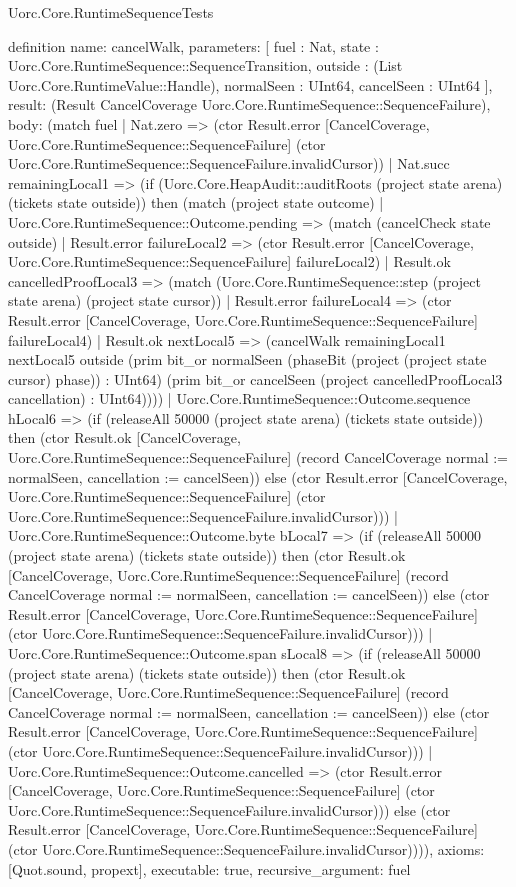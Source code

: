 \begin{lexlean}{Uorc.Core.RuntimeSequenceTests}
\begin{semanticmodule}
definition{
  name: cancelWalk,
  parameters: [
    fuel : Nat,
    state : Uorc.Core.RuntimeSequence::SequenceTransition,
    outside : (List Uorc.Core.RuntimeValue::Handle),
    normalSeen : UInt64,
    cancelSeen : UInt64
  ],
  result: (Result CancelCoverage Uorc.Core.RuntimeSequence::SequenceFailure),
  body: (match fuel
    | Nat.zero => (ctor Result.error [CancelCoverage, Uorc.Core.RuntimeSequence::SequenceFailure] (ctor Uorc.Core.RuntimeSequence::SequenceFailure.invalidCursor))
    | Nat.succ remainingLocal1 => (if (Uorc.Core.HeapAudit::auditRoots (project state arena) (tickets state outside)) then (match (project state outcome)
      | Uorc.Core.RuntimeSequence::Outcome.pending => (match (cancelCheck state outside)
        | Result.error failureLocal2 => (ctor Result.error [CancelCoverage, Uorc.Core.RuntimeSequence::SequenceFailure] failureLocal2)
        | Result.ok cancelledProofLocal3 => (match (Uorc.Core.RuntimeSequence::step (project state arena) (project state cursor))
          | Result.error failureLocal4 => (ctor Result.error [CancelCoverage, Uorc.Core.RuntimeSequence::SequenceFailure] failureLocal4)
          | Result.ok nextLocal5 => (cancelWalk remainingLocal1 nextLocal5 outside (prim bit_or normalSeen (phaseBit (project (project state cursor) phase)) : UInt64) (prim bit_or cancelSeen (project cancelledProofLocal3 cancellation) : UInt64))))
      | Uorc.Core.RuntimeSequence::Outcome.sequence hLocal6 => (if (releaseAll 50000 (project state arena) (tickets state outside)) then (ctor Result.ok [CancelCoverage, Uorc.Core.RuntimeSequence::SequenceFailure] (record CancelCoverage {normal := normalSeen, cancellation := cancelSeen})) else (ctor Result.error [CancelCoverage, Uorc.Core.RuntimeSequence::SequenceFailure] (ctor Uorc.Core.RuntimeSequence::SequenceFailure.invalidCursor)))
      | Uorc.Core.RuntimeSequence::Outcome.byte bLocal7 => (if (releaseAll 50000 (project state arena) (tickets state outside)) then (ctor Result.ok [CancelCoverage, Uorc.Core.RuntimeSequence::SequenceFailure] (record CancelCoverage {normal := normalSeen, cancellation := cancelSeen})) else (ctor Result.error [CancelCoverage, Uorc.Core.RuntimeSequence::SequenceFailure] (ctor Uorc.Core.RuntimeSequence::SequenceFailure.invalidCursor)))
      | Uorc.Core.RuntimeSequence::Outcome.span sLocal8 => (if (releaseAll 50000 (project state arena) (tickets state outside)) then (ctor Result.ok [CancelCoverage, Uorc.Core.RuntimeSequence::SequenceFailure] (record CancelCoverage {normal := normalSeen, cancellation := cancelSeen})) else (ctor Result.error [CancelCoverage, Uorc.Core.RuntimeSequence::SequenceFailure] (ctor Uorc.Core.RuntimeSequence::SequenceFailure.invalidCursor)))
      | Uorc.Core.RuntimeSequence::Outcome.cancelled => (ctor Result.error [CancelCoverage, Uorc.Core.RuntimeSequence::SequenceFailure] (ctor Uorc.Core.RuntimeSequence::SequenceFailure.invalidCursor))) else (ctor Result.error [CancelCoverage, Uorc.Core.RuntimeSequence::SequenceFailure] (ctor Uorc.Core.RuntimeSequence::SequenceFailure.invalidCursor)))),
  axioms: [Quot.sound, propext],
  executable: true,
  recursive_argument: fuel
}


\end{semanticmodule}
\end{lexlean}
